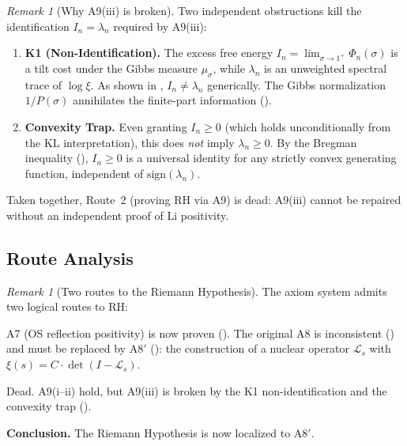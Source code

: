 \documentclass[12pt,a4paper]{article}
\theoremstyle{definition}
\theoremstyle{remark}
\newtheorem{remark}[theorem]{Remark}
\begin{document}
\begin{remark}[Why A9(iii) is broken]\label{rem:A9-broken}
Two independent obstructions kill the identification $I_n = \lambda_n$ required by A9(iii):

\begin{enumerate}[label=(\alph*)]
\item \textbf{K1 (Non-Identification).} The excess free energy $I_n = \lim_{\sigma \to 1^+} \Phi_n(\sigma)$ is a tilt cost under the Gibbs measure $\mu_\sigma$, while $\lambda_n$ is an unweighted spectral trace of $\log\xi$. As shown in , $I_n \neq \lambda_n$ generically. The Gibbs normalization $1/P(\sigma)$ annihilates the finite-part information ().

\item \textbf{Convexity Trap.} Even granting $I_n \ge 0$ (which holds unconditionally from the KL interpretation), this does \emph{not} imply $\lambda_n \ge 0$. By the Bregman inequality (), $I_n \ge 0$ is a universal identity for any strictly convex generating function, independent of $\mathrm{sign}(\lambda_n)$.
\end{enumerate}

\noindent
Taken together, Route~2 (proving RH via A9) is dead: A9(iii) cannot be repaired without an independent proof of Li positivity.
\end{remark}

\subsection{Route Analysis}

\begin{remark}[Two routes to the Riemann Hypothesis]\label{rem:route-analysis}
The axiom system admits two logical routes to RH:

\begin{description}[font=\bfseries,leftmargin=2em]
\item[Route 1 (A7 $+$ A8$'$):]
A7 (OS reflection positivity) is now proven (). The original A8 is inconsistent () and must be replaced by A8$'$ (): the construction of a nuclear operator $\mathcal{L}_s$ with $\xi(s) = C \cdot \det(I - \mathcal{L}_s)$.

\item[Route 2 (A9):]
Dead. A9(i--ii) hold, but A9(iii) is broken by the K1 non-identification and the convexity trap ().
\end{description}

\noindent
\textbf{Conclusion.} The Riemann Hypothesis is now localized to A8$'$.
\end{remark}
\end{document}
